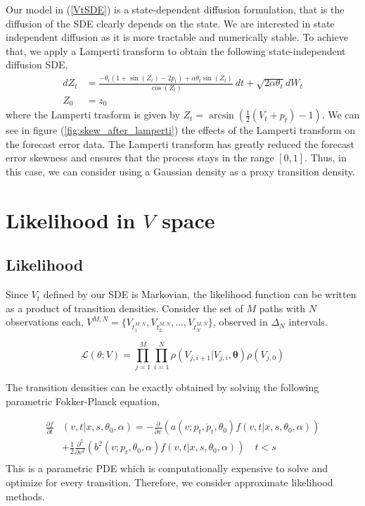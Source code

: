 \documentclass[10pt,twocolumn,letterpaper]{article}
\begin{document}
Our model in (\ref{VtSDE}) is  a state-dependent diffusion formulation, that is the diffusion of the SDE clearly depends on the state.  We are interested in state independent diffusion as it is more tractable and numerically stable. To achieve that, we apply a Lamperti transform to obtain the following state-independent diffusion SDE,
\begin{equation}
  \begin{split}
    dZ_t&= \frac{- \theta_t (1+ \sin(Z_t) - 2p_t) + \alpha \theta_t \sin (Z_t)   }{\cos (Z_t)} \ dt + \sqrt{2 \alpha \theta_t} dW_t \\
    Z_0&=z_0
  \end{split}
\end{equation}
where the Lamperti trasform is given by $Z_t = \arcsin \left( \frac{1}{2} \left( V_t+p_t \right) - 1 \right) $. We can see in figure (\ref{fig:skew_after_lamperti}) the effects of the Lamperti transform on the forecast error data. The Lamperti transform has greatly reduced  the forecast error skewness and ensures that the process stays in the range $[0,1]$. Thus, in this case,  we can consider using a Gaussian density as a proxy transition density.

\section{Likelihood in $V$ space} \label{Section_4}

\subsection{Likelihood}

Since $V_t$ defined by our SDE is Markovian, the likelihood function can be written as a product of transition densities.  Consider the set of $M$ paths with $N$ observations each, $ V^{M,N}=\{ V_{t_1^{M,N}} , V_{t_2^{M,N}} ,\ldots , V_{t_N^{M,N}} \}$, observed in $\Delta_N$ intervals.

\begin{equation}
\mathcal{L}(\theta;V) =\prod\limits_{j=1}^M \prod\limits_{i=1}^N \rho ( {V_{j,i+1}|V_{j,i}},\bm{\theta} )  \rho (V_{j,0})
\label{likelihood}
\end{equation}

The transition densities can be exactly obtained by solving the following parametric Fokker-Planck equation,

\begin{equation}
\begin{split}
\frac{ \partial f }{\partial t } & (v ,t | x , s, \theta_0 , \alpha )= - \frac{\partial}{ \partial v} ( a( v;  p_t, \dot{p}_t, \theta_0 ) f( v ,t | x , s, \theta_0  , \alpha ) ) \\
& + \frac{1}{2} \frac{\partial^2}{ \partial v^2} ( b^2(v; p_t, \theta_0, \alpha  )  f(v ,t | x , s,\theta_0 , \alpha ) ) \quad  t < s\\
\end{split}
\end{equation}
This is a parametric PDE which is computationally expensive to solve and optimize for every transition. Therefore, we consider approximate likelihood methods.
\end{document}
